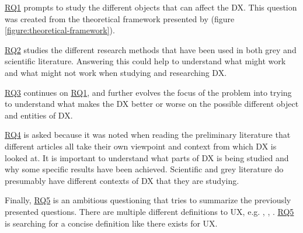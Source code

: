 \documentclass[english, 12pt, a4paper, sci, utf8, a-1b, online]{aaltothesis}
\begin{document}
\hyperref[RQ1]{RQ1} prompts to study the different objects that can affect the DX. This question was created from the theoretical framework presented by \textcite[70]{fagerholm-doctoral-thesis} (figure \ref{figure:theoretical-framework}).

\hyperref[RQ2]{RQ2} studies the different research methods that have been used in both grey and scientific literature. Answering this could help to understand what might work and what might not work when studying and researching DX.

\hyperref[RQ3]{RQ3} continues on \hyperref[RQ1]{RQ1}, and further evolves the focus of the problem into trying to understand what makes the DX better or worse on the possible different object and entities of DX.

\hyperref[RQ4]{RQ4} is asked because it was noted when reading the preliminary literature that different articles all take their own viewpoint and context from which DX is looked at. It is important to understand what parts of DX is being studied and why some specific results have been achieved. Scientific and grey literature do presumably have different contexts of DX that they are studying.

Finally, \hyperref[RQ5]{RQ5} is an ambitious questioning that tries to summarize the previously presented questions. There are multiple different definitions to UX, e.g. \parencite{iso-9241-210}, \parencite{understanding-ux}, \parencite{ux-research-agenda}. \hyperref[RQ5]{RQ5} is searching for a concise definition like there exists for UX.




\end{document}
